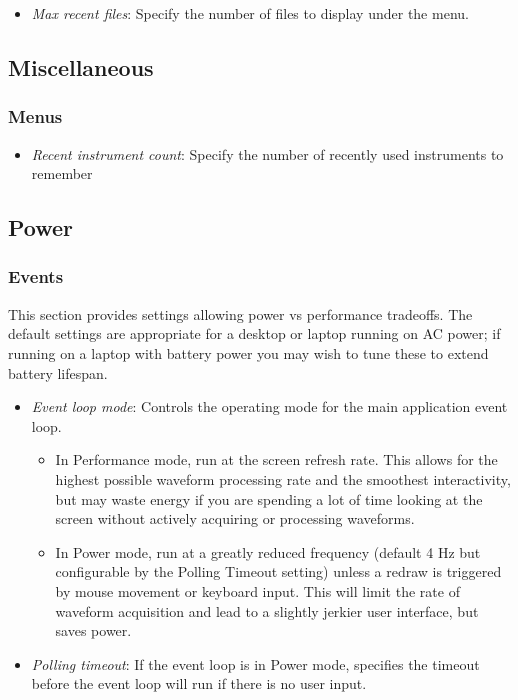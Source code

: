 \begin{itemize}
\item \emph{Max recent files}: Specify the number of files to display under the  menu.
\end{itemize}

\subsection{Miscellaneous}

\subsubsection{Menus}

\begin{itemize}
\item \emph{Recent instrument count}: Specify the number of recently used instruments to remember
\end{itemize}

\subsection{Power}

\subsubsection{Events}

This section provides settings allowing power vs performance tradeoffs. The default settings are appropriate for a
desktop or laptop running on AC power; if running on a laptop with battery power you may wish to tune these to extend
battery lifespan.

\begin{itemize}
\item \emph{Event loop mode}: Controls the operating mode for the main application event loop.
\begin{itemize}
\item In Performance mode, run at the screen refresh rate. This allows for the highest possible waveform processing rate
and the smoothest interactivity, but may waste energy if you are spending a lot of time looking at the screen without
actively acquiring or processing waveforms.
\item In Power mode, run at a greatly reduced frequency (default 4 Hz but configurable by the Polling Timeout setting)
unless a redraw is triggered by mouse movement or keyboard input. This will limit the rate of waveform acquisition and
lead to a slightly jerkier user interface, but saves power.
\end{itemize}
\item \emph{Polling timeout}: If the event loop is in Power mode, specifies the timeout before the event loop will run
if there is no user input.
\end{itemize}

